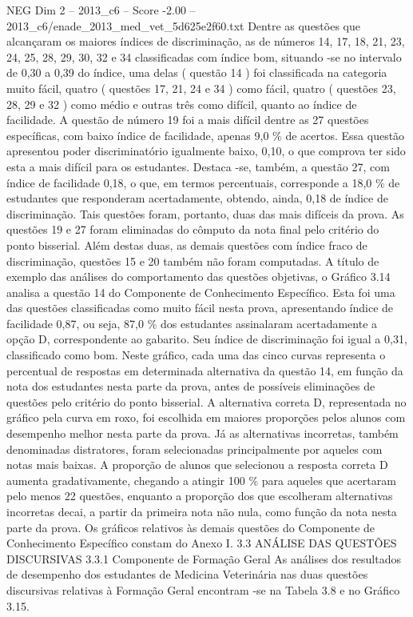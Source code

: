 \begin{textsample}{NEG Dim 2 – 2013\_c6 – Score -2.00 – 2013\_c6/enade\_2013\_med\_vet\_5d625e2f60.txt}
Dentre as questões que alcançaram os maiores índices de discriminação, as de números 14, 17, 18, 21, 23, 24, 25, 28, 29, 30, 32 e 34 classificadas com índice bom, situando -se no intervalo de 0,30 a 0,39 do índice, uma delas ( questão 14 ) foi classificada na categoria muito fácil, quatro ( questões 17, 21, 24 e 34 ) como fácil, quatro ( questões 23, 28, 29 e 32 ) como médio e outras três como difícil, quanto ao índice de facilidade.
A questão de número 19 foi a mais difícil dentre as 27 questões específicas, com baixo índice de facilidade, apenas 9,0 \% de acertos.
Essa questão apresentou poder discriminatório igualmente baixo, 0,10, o que comprova ter sido esta a mais difícil para os estudantes.
Destaca -se, também, a questão 27, com índice de facilidade 0,18, o que, em termos percentuais, corresponde a 18,0 \% de estudantes que responderam acertadamente, obtendo, ainda, 0,18 de índice de discriminação.
Tais questões foram, portanto, duas das mais difíceis da prova.
As questões 19 e 27 foram eliminadas do cômputo da nota final pelo critério do ponto bisserial.
Além destas duas, as demais questões com índice fraco de discriminação, questões 15 e 20 também não foram computadas.
A título de exemplo das análises do comportamento das questões objetivas, o Gráfico 3.14 analisa a questão 14 do Componente de Conhecimento Específico.
Esta foi uma das questões classificadas como muito fácil nesta prova, apresentando índice de facilidade 0,87, ou seja, 87,0 \% dos estudantes assinalaram acertadamente a opção D, correspondente ao gabarito.
Seu índice de discriminação foi igual a 0,31, classificado como bom.
Neste gráfico, cada uma das cinco curvas representa o percentual de respostas em determinada alternativa da questão 14, em função da nota dos estudantes nesta parte da prova, antes de possíveis eliminações de questões pelo critério do ponto bisserial.
A alternativa correta D, representada no gráfico pela curva em roxo, foi escolhida em maiores proporções pelos alunos com desempenho melhor nesta parte da prova.
Já as alternativas incorretas, também denominadas distratores, foram selecionadas principalmente por aqueles com notas mais baixas.
A proporção de alunos que selecionou a resposta correta D aumenta gradativamente, chegando a atingir 100 \% para aqueles que acertaram pelo menos 22 questões, enquanto a proporção dos que escolheram alternativas incorretas decai, a partir da primeira nota não nula, como função da nota nesta parte da prova.
Os gráficos relativos às demais questões do Componente de Conhecimento Específico constam do Anexo I. 3.3 ANÁLISE DAS QUESTÕES DISCURSIVAS 3.3.1 Componente de Formação Geral As análises dos resultados de desempenho dos estudantes de Medicina Veterinária nas duas questões discursivas relativas à Formação Geral encontram -se na Tabela 3.8 e no Gráfico 3.15.

\end{textsample}

